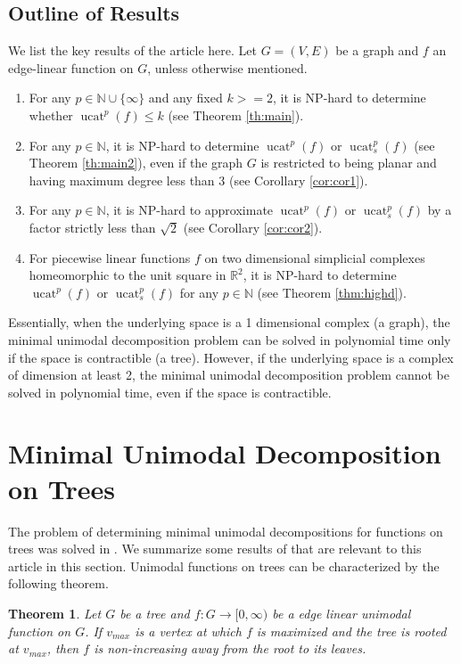 \documentclass[11pt]{article}
\DeclareMathOperator{\ucat}{ucat}
\newtheorem{thm}{Theorem}[section]
\begin{document}
 \subsection{Outline of Results}

We list the key results of the article here. Let $G = (V, E)$ be a graph and $f$ an edge-linear function on $G$, unless otherwise mentioned.

\begin{enumerate}
    \item For any $p \in \mathbb{N} \cup \{\infty\}$ and any fixed $k >= 2$, it is NP-hard to determine whether $\ucat^p(f) \leq k$ (see Theorem \ref{th:main}).
    \item For any $p \in \mathbb{N}$, it is NP-hard to determine $\ucat^p(f)$ or $\ucat_s^p(f)$ (see Theorem \ref{th:main2}), even if the graph $G$ is restricted to being planar and having maximum degree less than 3 (see Corollary \ref{cor:cor1}). 
    \item For any $p \in \mathbb{N}$, it is NP-hard to approximate $\ucat^p(f)$ or $\ucat_s^p(f)$ by a factor strictly less than $\sqrt{2}$ (see Corollary \ref{cor:cor2}).
    \item For piecewise linear functions $f$ on two dimensional simplicial complexes  homeomorphic to the unit square in $\mathbb{R}^2$, it is NP-hard to determine  $\ucat^p(f)$ or $\ucat_s^p(f)$ for any $p \in \mathbb{N}$ (see Theorem \ref{thm:highd}).
\end{enumerate}

Essentially, when the underlying space is a 1 dimensional complex (a graph), the minimal unimodal decomposition problem can be solved in polynomial time only if the space is contractible (a tree). However, if the underlying space is a complex of dimension at least 2, the minimal unimodal decomposition problem cannot be solved in polynomial time, even if the space is contractible.

\section{Minimal Unimodal Decomposition on Trees}

The problem of determining minimal unimodal decompositions for functions on trees was solved in \cite{Bar20}. We summarize some results of \cite{Bar20} that are relevant to this article in this section. Unimodal functions on trees can be characterized by the following theorem.

\begin{thm}
\label{char-unimod-tree}
Let $G$ be a tree and $f : G \rightarrow [0,\infty)$ be a edge linear unimodal function on $G$. If $v_{max}$ is a vertex at which $f$ is maximized and the tree is rooted at $v_{max}$, then $f$ is non-increasing away from the root to its leaves.
\end{thm}
\end{document}
